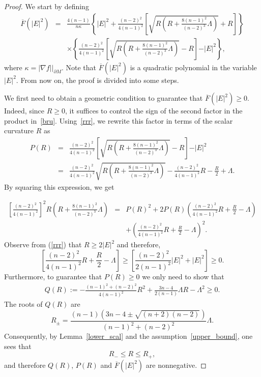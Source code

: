 \documentclass{amsart}
\numberwithin{equation}{section}
\begin{document}
\begin{proof} We start by defining
\begin{eqnarray}\label{bru}
\overline{F}(\vert E \vert^{2}) &=& \frac{4(n-1)}{n \kappa} \left\{ \vert E \vert^{2} + \frac{(n-2)^2}{4(n - 1)^2} \left[ \sqrt{R \left( R + \frac{8(n-1)^2}{(n-2)^3} \Lambda \right)} + R \right] \right\} \nonumber \\
&& \times \left\{ \frac{(n-2)^2}{4(n - 1)^2} \left[ \sqrt{R \left( R + \frac{8(n-1)^2}{(n-2)^3} \Lambda \right)} - R \right] - \vert E \vert^{2} \right\},
\end{eqnarray}
where \(\kappa = \left| \nabla f \right| \big|_{\partial M}\). Note that \(\overline{F}(\vert E \vert^{2})\) is a quadratic polynomial in the variable \(\vert E \vert^{2}\). From now on, the proof is divided into some steps.


We first need to obtain a geometric condition to guarantee that $\overline{F}(\vert E \vert^{2})\geq 0$. Indeed, since \(R \geq 0\), it suffices to control the sign of the second factor in the product in~\eqref{bru}. Using~\eqref{rrr}, we rewrite this factor in terms of the scalar curvature \(R\) as
\begin{eqnarray*}
P(R) &=& \frac{(n-2)^2}{4(n - 1)^2} \left[ \sqrt{R \left( R + \frac{8(n-1)^2}{(n-2)^3} \Lambda \right)} - R \right] - \vert E \vert^{2} \\
&=& \frac{(n-2)^2}{4(n - 1)^2} \sqrt{R \left( R + \frac{8(n-1)^2}{(n-2)^3} \Lambda \right)} - \frac{(n-2)^2}{4(n - 1)^2} R - \frac{R}{2} + \Lambda.
\end{eqnarray*} By squaring this expression, we get



\begin{eqnarray}
\left[\frac{(n-2)^2}{4(n - 1)^2}\right]^{2} R \left( R + \frac{8(n-1)^2}{(n-2)^3} \Lambda \right) 
&=& P(R)^{2} + 2P(R) \left( \frac{(n-2)^2}{4(n - 1)^2} R + \frac{R}{2} - \Lambda \right) \nonumber \\
&& + \left( \frac{(n-2)^2}{4(n - 1)^2} R + \frac{R}{2} - \Lambda \right)^{2}. \label{sqr_P}
\end{eqnarray} Observe from (\ref{rrr}) that \(R \geq 2|E|^{2}\) and therefore,
\[
\left[\frac{(n-2)^2}{4(n - 1)^2} R + \frac{R}{2} - \Lambda \right] \geq \left[\frac{(n-2)^2}{2(n - 1)^2}|E|^{2} + |E|^{2} \right] \geq 0.
\]
Furthermore, to guarantee that \(P(R) \geq 0\) we only need to show that
\begin{eqnarray}\label{cuidado com o sinal}
Q(R) := -\frac{(n-1)^2 + (n-2)^2}{4(n-1)^2} R^{2} + \frac{3n - 4}{2(n - 1)} \Lambda R - \Lambda^{2} \geq 0.
\end{eqnarray} The roots of \(Q(R)\) are
\[
R_{\pm} = \frac{(n-1) \left( 3n - 4 \pm \sqrt{(n+2)(n-2)} \right)}{(n-1)^2 + (n-2)^2} \Lambda.
\] Consequently, by Lemma~\ref{lower_scal} and the assumption~\eqref{upper_bound}, one sees that
\[
R_{-} \leq R \leq R_{+},
\]
and therefore \(Q(R)\), \(P(R)\) and $\overline{F}(\vert E\vert^{2})$ are nonnegative.



\end{proof}
\end{document}
